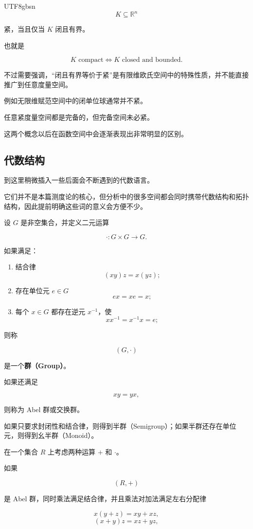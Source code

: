 \documentclass[11pt]{article}
\begin{document}
\begin{CJK*}{UTF8}{gbsn}
\[
K\subseteq\mathbb{R}^{n}
\]

紧，当且仅当 $K$ 闭且有界。

也就是

\[
K\text{ compact}\Longleftrightarrow K\text{ closed and bounded}.
\]

不过需要强调，“闭且有界等价于紧”是有限维欧氏空间中的特殊性质，并不能直接推广到任意度量空间。

例如无限维赋范空间中的闭单位球通常并不紧。

任意紧度量空间都是完备的，但完备空间未必紧。

这两个概念以后在函数空间中会逐渐表现出非常明显的区别。

\subsection{代数结构}

到这里稍微插入一些后面会不断遇到的代数语言。

它们并不是本篇测度论的核心，但分析中的很多空间都会同时携带代数结构和拓扑结构，因此提前明确这些词的意义会方便不少。

设 $G$ 是非空集合，并定义二元运算

\[
\cdot:G\times G\rightarrow G.
\]

如果满足：

\begin{enumerate}
  \item 结合律
  \[
  (xy)z=x(yz);
  \]
  \item 存在单位元 $e\in G$
  \[
  ex=xe=x;
  \]
  \item 每个 $x\in G$ 都存在逆元 $x^{-1}$，使
  \[
  xx^{-1}=x^{-1}x=e;
  \]
\end{enumerate}

则称

\[
(G,\cdot)
\]

是一个\textbf{群（Group）}。

如果还满足

\[
xy=yx,
\]

则称为 Abel 群或交换群。

如果只要求封闭性和结合律，则得到半群（Semigroup）；如果半群还存在单位元，则得到幺半群（Monoid）。

在一个集合 $R$ 上考虑两种运算 $+$ 和 $\cdot$。

如果

\[
(R,+)
\]

是 Abel 群，同时乘法满足结合律，并且乘法对加法满足左右分配律

\[
x(y+z)=xy+xz,
\]
\[
(x+y)z=xz+yz,
\]


\end{CJK*}
\end{document}
